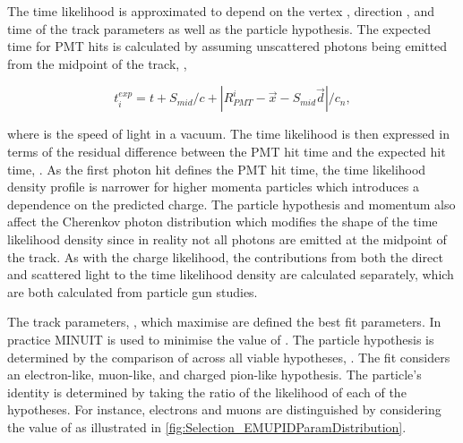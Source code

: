 The time likelihood is approximated to depend on the vertex , direction , and time  of the track parameters as well as the particle hypothesis. The expected time for PMT hits is calculated by assuming unscattered photons being emitted from the midpoint of the track, ,

\begin{equation}
  t^{exp}_{i} = t + S_{mid}/c + |R_{PMT}^{i} - \vec{x} - S_{mid}\vec{d}|/c_{n},
\end{equation}

where  is the speed of light in a vacuum. The time likelihood is then expressed in terms of the residual difference between the PMT hit time and the expected hit time, . As the first photon hit defines the PMT hit time, the time likelihood density profile is narrower for higher momenta particles which introduces a dependence on the predicted charge. The particle hypothesis and momentum also affect the Cherenkov photon distribution which modifies the shape of the time likelihood density since in reality not all photons are emitted at the midpoint of the track. As with the charge likelihood, the contributions from both the direct and scattered light to the time likelihood density are calculated separately, which are both calculated from particle gun studies.

The track parameters, \quickmath{\vec{\theta}}, which maximise  are defined the best fit parameters. In practice MINUIT \cite{James:2296388} is used to minimise the value of . The particle hypothesis is determined by the comparison of   across all viable hypotheses, \quickmath{\Gamma}. The fit considers an electron-like, muon-like, and charged pion-like hypothesis. The particle's identity is determined by taking the ratio of the likelihood of each of the hypotheses. For instance, electrons and muons are distinguished by considering the value of  as illustrated in \autoref{fig:Selection_EMUPIDParamDistribution}.

